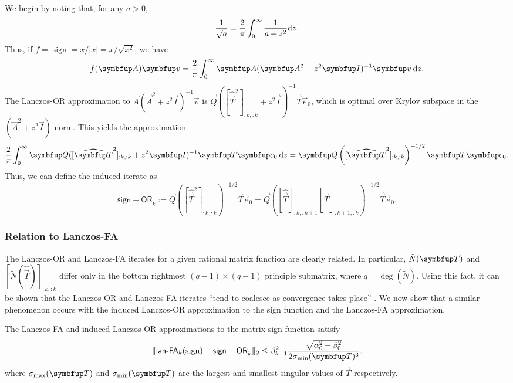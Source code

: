 We begin by noting that, for any $a>0$,
\begin{equation*}
    \frac{1}{\sqrt{a}}
    = \frac{2}{\pi} \int_0^\infty \frac{1}{a + z^2} \textup{d}{z}.
\end{equation*}
Thus, if $f = \operatorname{sign}=x/|x| = x/\sqrt{x^2}$, we have 
\begin{equation*}
    \fA\vec{v} = \frac{2}{\pi} \int_0^\infty  \vec{A}(\vec{A}^2 + z^2\vec{I})^{-1} \vec{v} \: \d{z}.
\end{equation*}
The Lanczos-OR approximation to $\vec{A}(\vec{A}^2 + z^2\vec{I})^{-1} \vec{v}$ is $\vec{Q} ([\widehat{\vec{T}}^2]_{:k,:k} + z^2\vec{I})^{-1} \vec{T} \vec{e}_0$, which is optimal over Krylov subspace in the $(\vec{A}^2 + z^2\vec{I})$-norm.
This yields the approximation 
\begin{equation*}
    \frac{2}{\pi} \int_0^\infty \vec{Q} ([\widehat{\vec{T}}^2]_{:k,:k} + z^2\vec{I})^{-1} \vec{T} \vec{e}_0 \: \d{z}
    = \vec{Q} \left([\widehat{\vec{T}}^2]_{:k,:k} \right)^{-1/2} \vec{T}  \vec{e}_0.
\end{equation*}
Thus, we can define the induced iterate as
\begin{equation}
    \label{def:sign_or}
\mathsf{sign-OR}_k := \vec{Q} \left([\widehat{\vec{T}}^2]_{:k,:k} \right)^{-1/2} \vec{T}  \vec{e}_0
=
\vec{Q} \left( [\widehat{\vec{T}}]_{:k,:k+1}[\widehat{\vec{T}}]_{:k+1,:k} \right)^{-1/2} \vec{T}  \vec{e}_0.
\end{equation}


\subsubsection{Relation to Lanczos-FA}

The Lanczos-OR and Lanczos-FA iterates for a given rational matrix function are clearly related. 
In particular, $\tilde{N}\mf{\vec{T}}$ and $[\tilde{N}(\widehat{\vec{T}})]_{:k,:k}$ differ only in the bottom rightmost $(q-1)\times (q-1)$ principle submatrix, where $q = \deg(\tilde{N})$.
Using this fact, it can be shown that the Lanczos-OR and Lanczos-FA iterates ``tend to coalesce as convergence takes place'' \cite[Proposition 5.1]{lopez_simoncini_06}.
We now show that a similar phenomenon occurs with the induced Lanczos-OR approximation to the sign function and the Lanczos-FA approximation.

\begin{theorem}
\label{thm:sign_approx_compare}
The Lanczos-FA and induced Lanczos-OR approximations to the matrix sign function satisfy
\begin{equation*}
    \| \lan_k(\operatorname{sign}) - \mathsf{sign-OR}_k \|_2
    \leq
    \beta_{k-1}^2 
    \frac{\sqrt{\alpha_0^2+\beta_0^2}}{2 \sigma_{\textup{min}}\mf{\vec{T}}^3}.
\end{equation*}
where $\sigma_{\textup{max}}\mf{\vec{T}}$ and $\sigma_{\textup{min}}\mf{\vec{T}}$ are the largest and smallest singular values of $\vec{T}$ respectively.
\end{theorem}


